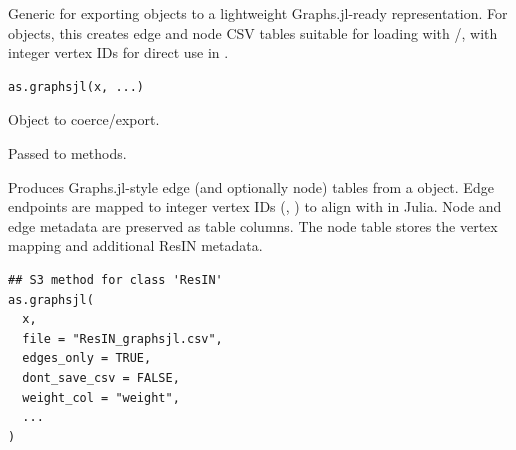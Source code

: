 \documentclass[a4paper]{book}
\begin{document}
%
\begin{Description}
Generic for exporting objects to a lightweight Graphs.jl-ready representation.
For  objects, this creates edge and node CSV tables suitable for
loading with /, with integer vertex IDs for
direct use in .
\end{Description}
%
\begin{Usage}
\begin{verbatim}
as.graphsjl(x, ...)
\end{verbatim}
\end{Usage}
%
\begin{Arguments}
\begin{ldescription}
\item[\code{x}] Object to coerce/export.

\item[\code{...}] Passed to methods.
\end{ldescription}
\end{Arguments}
%
\begin{Description}
Produces Graphs.jl-style edge (and optionally node) tables from a 
object. Edge endpoints are mapped to integer vertex IDs (, )
to align with  in Julia. Node and edge metadata are preserved as table
columns. The node table stores the vertex mapping and additional ResIN metadata.
\end{Description}
%
\begin{Usage}
\begin{verbatim}
## S3 method for class 'ResIN'
as.graphsjl(
  x,
  file = "ResIN_graphsjl.csv",
  edges_only = TRUE,
  dont_save_csv = FALSE,
  weight_col = "weight",
  ...
)
\end{verbatim}
\end{Usage}
%
\end{document}
